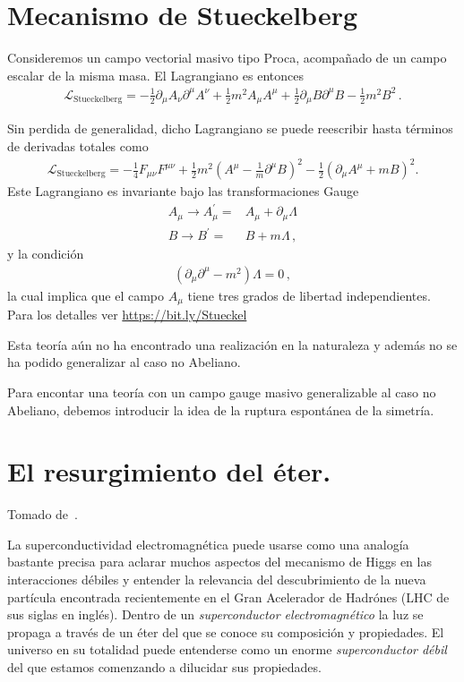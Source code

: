 \section{Mecanismo de Stueckelberg}
Consideremos un campo vectorial masivo tipo Proca, acompañado de un campo escalar de la misma masa. El Lagrangiano es entonces~\cite{Ruegg:2003ps}
\begin{align}
\mathcal{L}_{\text{Stueckelberg}}  =-\frac{1}{2} \partial_{\mu} A_{\nu} \partial^{\mu} A^{\nu}+\frac{1}{2} m^{2} A_\mu A^\mu+\frac{1}{2} \partial_{\mu} B \partial^{\mu} B-\frac{1}{2} m^{2} B^{2}\,.
\end{align}

Sin perdida de generalidad, dicho Lagrangiano se puede reescribir hasta términos de derivadas totales como
\begin{align}
  \mathcal{L}_{\text{Stueckelberg}}=-\frac{1}{4} F_{\mu \nu} F^{\mu \nu}+\frac{1}{2} m^{2}\left(A^{\mu}-\frac{1}{m} \partial^{\mu}B\right)^{2}-\frac{1}{2}\left(\partial_{\mu} A^\mu+m B\right)^{2}.
\end{align}
Este Lagrangiano es invariante bajo las transformaciones Gauge
\begin{align}
  A_{\mu} \rightarrow A_{\mu}^{\prime}=&A_{\mu}+\partial_{\mu} \Lambda \nonumber\\ 
B \rightarrow B^{\prime}=&B+m \Lambda\,,
\end{align}
y la condición
\begin{align}
  \left( \partial_\mu\partial^\mu-m^2   \right)\Lambda=0\,,
\end{align}
la cual implica que el campo $A_\mu$ tiene tres grados de libertad independientes. Para los detalles ver \url{https://bit.ly/Stueckel}

Esta teoría aún no ha encontrado una realización en la naturaleza y además no se ha podido generalizar al caso no Abeliano.

Para encontar una teoría con un campo gauge masivo generalizable al caso no Abeliano, debemos introducir la idea de la ruptura espontánea de la simetría.

\section{El resurgimiento del éter.}

Tomado de~\cite{restrepo2013resurgimiento}.


  La superconductividad electromagnética puede usarse como una analogía bastante precisa para aclarar muchos aspectos del mecanismo de Higgs en las interacciones débiles y  entender la relevancia del descubrimiento de la nueva partícula encontrada recientemente en el Gran Acelerador de Hadrónes (LHC de sus siglas en inglés).  Dentro de un \emph{superconductor electromagnético} la luz se propaga a través de un éter del que se conoce su composición y propiedades. El universo en su totalidad puede entenderse como un enorme \emph{superconductor débil} del que estamos comenzando a dilucidar sus propiedades.


